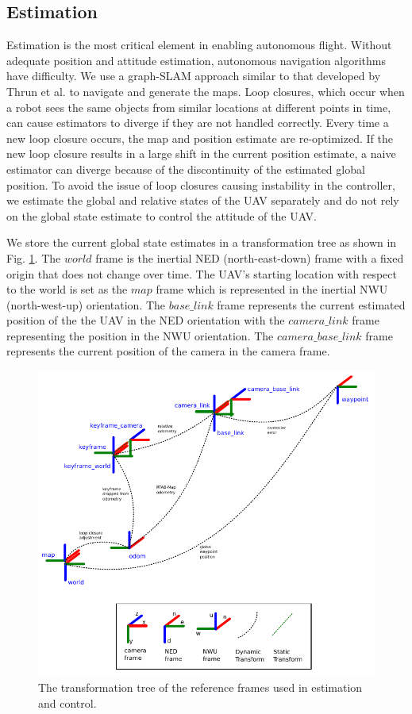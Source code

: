 \documentclass[letterpaper, 10 pt, conference]{ieeeconf}  %
\begin{document}
\subsection{Estimation}

Estimation is the most critical element in enabling autonomous flight. Without adequate position and attitude estimation, autonomous navigation algorithms have difficulty. We use a graph-SLAM approach similar to that developed by Thrun et al. \cite{Thrun2006} to navigate and generate the maps. Loop closures, which occur when a robot sees the same objects from similar locations at different points in time, can cause estimators to diverge if they are not handled correctly. Every time a new loop closure occurs, the map and position estimate are re-optimized. If the new loop closure results in a large shift in the current position estimate, a naive estimator can diverge because of the discontinuity of the estimated global position. To avoid the issue of loop closures causing instability in the controller, we estimate the global and relative states of the UAV separately and do not rely on the global state estimate to control the attitude of the UAV.

We store the current global state estimates in a transformation tree as shown in Fig. \ref{fig:tf_tree}. The $\mathit{world}$ frame is the inertial NED (north-east-down) frame with a fixed origin that does not change over time. The UAV's starting location with respect to the world is set as the $\mathit{map}$ frame which is represented in the inertial NWU (north-west-up) orientation. The $\mathit{base\_link}$ frame represents the current estimated position of the the UAV in the NED orientation with the $\mathit{camera\_link}$ frame representing the position in the NWU orientation. The $\mathit{camera\_base\_link}$ frame represents the current position of the camera in the camera frame.

\begin{figure}
\centering
\includegraphics[width=0.9\linewidth]{tf_tree_relative_rtab}
\caption{The transformation tree of the reference frames used in estimation and control.}
\label{fig:tf_tree}
\end{figure}
\end{document}
